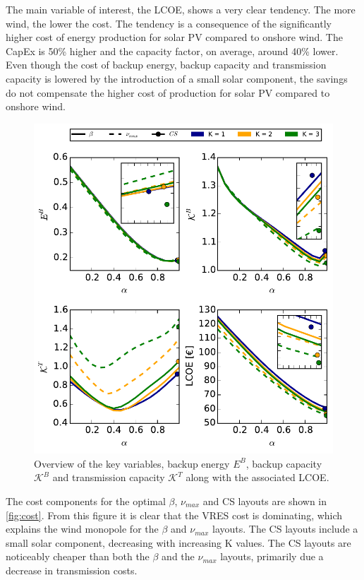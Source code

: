 \documentclass[a4paper, 12pt, sort&compress]{elsarticle}%
\begin{document}
The main variable of interest, the LCOE, shows a very clear
tendency. The more wind, the lower the cost. The tendency is a consequence
of the significantly higher cost of energy production for solar PV
compared to onshore wind. The CapEx is 50\% higher and the capacity
factor, on average, around 40\% lower. Even though the cost of backup
energy, backup capacity and transmission capacity is lowered by the
introduction of a small solar component, the savings do not compensate
the higher cost of production for solar PV compared to onshore wind.

\begin{figure}[h!]
  \centering
  \includegraphics[width = 1 \columnwidth]{data}
  \caption{Overview of the key variables, backup energy $E^{B}$,
    backup capacity $\mathcal{K}^{B}$ and transmission capacity
    $\mathcal{K}^{T}$ along with the associated LCOE.}
  \label{fig:overview}
\end{figure}

The cost components for the optimal $\beta$, $\nu_{max}$ and CS layouts are
shown in \cref{fig:cost}. From this figure it is clear that the VRES
cost is dominating, which explains the wind monopole for the $\beta$ and
$\nu_{max}$ layouts. The CS layouts include a small solar component,
decreasing with increasing K values. The CS layouts are noticeably
cheaper than both the $\beta$ and the $\nu_{max}$ layouts, primarily due a
decrease in transmission costs.
\end{document}
